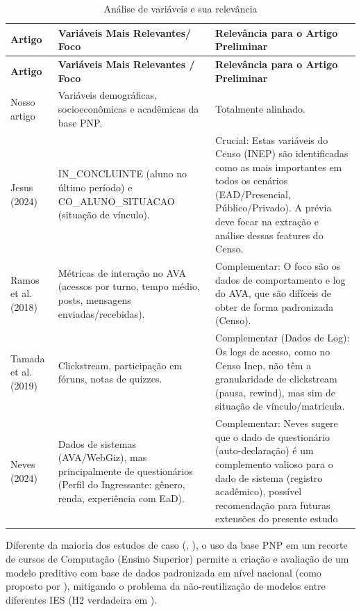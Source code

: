 \documentclass[english, spanish, brazilian]{RBIEarticle} %
\begin{document}
\begin{longtable}{|p{3cm}|p{5.5cm}|p{7cm}|}
    \caption{Análise de variáveis e sua relevância}\\
    \toprule
    \textbf{Artigo} & \textbf{Variáveis Mais Relevantes/ Foco} & \textbf{Relevância para o Artigo Preliminar} \\
    \midrule
    \endfirsthead
    \toprule
    \textbf{Artigo} & \textbf{Variáveis Mais Relevantes / Foco} & \textbf{Relevância para o Artigo Preliminar} \\
    \midrule
    \endhead
    Nosso artigo & Variáveis demográficas, socioeconômicas e acadêmicas da base PNP. & Totalmente alinhado. \\ \hline
    
    Jesus (2024) & IN\_CONCLUINTE (aluno no último período) e CO\_ALUNO\_SITUACAO (situação de vínculo). & Crucial: Estas variáveis do Censo (INEP) são identificadas como as mais importantes em todos os cenários (EAD/Presencial, Público/Privado). A prévia deve focar na extração e análise dessas features do Censo. \\ \hline
    
    Ramos et al. (2018) & Métricas de interação no AVA (acessos por turno, tempo médio, posts, mensagens enviadas/recebidas). & Complementar: O foco são os dados de comportamento e log do AVA, que são difíceis de obter de forma padronizada (Censo). \\ \hline
    
    Tamada et al. (2019) & Clickstream, participação em fóruns, notas de quizzes. & Complementar (Dados de Log): Os logs de acesso, como no Censo Inep, não têm a granularidade de clickstream (pausa, rewind), mas sim de situação de vínculo/matrícula. \\ \hline
    
    Neves (2024) & Dados de sistemas (AVA/WebGiz), mas principalmente de questionários (Perfil do Ingressante: gênero, renda, experiência com EaD). & Complementar: Neves sugere que o dado de questionário (auto-declaração) é um complemento valioso para o dado de sistema (registro acadêmico), possível recomendação para futuras extensões do presente estudo \\ 
    \bottomrule
\end{longtable}

Diferente da maioria dos estudos de caso (\cite{ramos2018comparativo}, \cite{neves2024ficare}), o uso da base PNP em um recorte de cursos de Computação (Ensino Superior) permite a criação e avaliação de um modelo preditivo com base de dados padronizada em nível nacional (como proposto por \cite{jesus2024mapeamento}), mitigando o problema da não-reutilização de modelos entre diferentes IES (H2 verdadeira em \cite{jesus2024mapeamento}).
\end{document}
